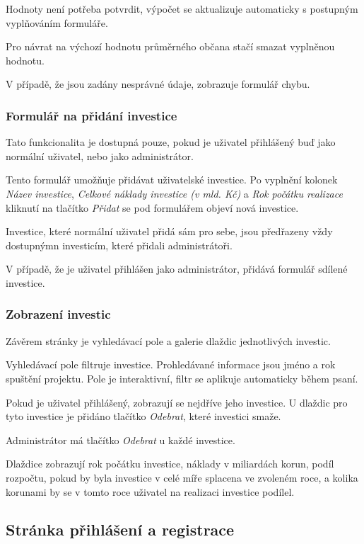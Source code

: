 \documentclass[11pt,a4paper,twoside,openright]{report}
\begin{document}
Hodnoty není potřeba potvrdit, výpočet se aktualizuje automaticky s postupným
vyplňováním formuláře.

Pro návrat na výchozí hodnotu průměrného občana stačí smazat vyplněnou hodnotu.

V případě, že jsou zadány nesprávné údaje, zobrazuje formulář chybu.

\subsubsection{Formulář na přidání investice}

Tato funkcionalita je dostupná pouze, pokud je uživatel přihlášený buď jako
normální uživatel, nebo jako administrátor.

Tento formulář umožňuje přidávat uživatelské investice. Po vyplnění kolonek
\emph{Název investice}, \emph{Celkové náklady investice (v mld. Kč)} a
\emph{Rok počátku realizace} kliknutí na tlačítko \emph{Přidat} se pod formulářem
objeví nová investice.

Investice, které normální uživatel přidá sám pro sebe, jsou předřazeny vždy dostupnýmn investicím,
které přidali administrátoři.

V případě, že je uživatel přihlášen jako administrátor, přidává formulář
sdílené investice.

\subsubsection{Zobrazení investic}
Závěrem stránky je vyhledávací pole a galerie dlaždic jednotlivých investic.

Vyhledávací pole filtruje investice. Prohledávané informace jsou jméno a rok
spuštění projektu. Pole je interaktivní, filtr se aplikuje automaticky
během psaní.

Pokud je uživatel přihlášený, zobrazují se nejdříve jeho investice. U dlaždic
pro tyto investice je přidáno tlačítko \emph{Odebrat}, které investici smaže.

Administrátor má tlačítko \emph{Odebrat} u každé investice.

Dlaždice zobrazují rok počátku investice, náklady v miliardách korun, podíl
rozpočtu, pokud by byla investice v celé míře splacena ve zvoleném roce, a
kolika korunami by se v tomto roce uživatel na realizaci investice podílel.

\subsection{Stránka přihlášení a registrace}
\end{document}
